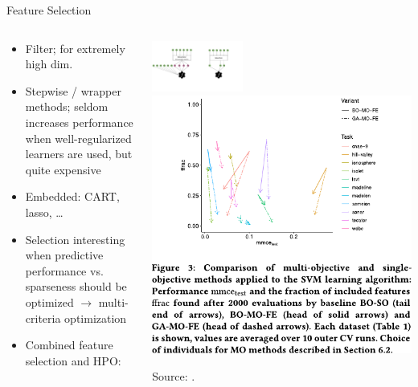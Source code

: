 	\begin{frame}{Feature Selection}
		\begin{columns}
			\begin{column}{0.4\textwidth}
				\begin{itemize}
					
					\item Filter; for extremely high dim.
					\item Stepwise / wrapper methods; 
					seldom increases performance when well-regularized 
					learners are used, but quite expensive 
					\item Embedded: CART, lasso, \ldots 
					\item Selection interesting when predictive performance vs. sparseness
					should be optimized $\rightarrow$ multi-criteria optimization
					\item Combined feature selection and HPO: 
					
				\end{itemize}
			\end{column}%
			\begin{column}{0.6\textwidth}
				\begin{center}
					\includegraphics[width=0.35\textwidth, trim=450 100 110 60, clip]{images/feat_extr_vs_selection.pdf}%
					\includegraphics[width=0.55\linewidth]{images/Binder2020multiobjective_fig3.pdf}
					
					
					{\tiny \hfill Source: .}
				\end{center}
			\end{column}
		\end{columns}
		
	\end{frame}
	
